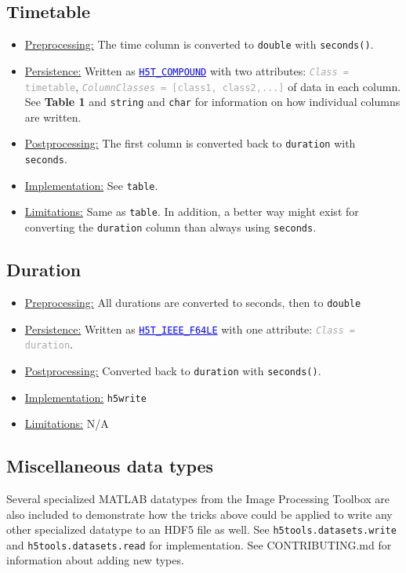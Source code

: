 \documentclass[11pt]{exam}
\newcommand\myurl[1]{\textcolor{blue}{\underline{#1}}}
\newcommand\myfcn[1]{\colorbox{codegray}{\textcolor{codeblue}{\texttt{#1}}}}
\newcommand\matfcn[1]{\textcolor{darkteal}{\texttt{#1}}}
\newcommand\hdftype[1]{\texttt{\myurl{#1}}}
\newcommand\myatt[2]{\textcolor{darkgray}{\texttt{\textit{#1} = #2}}}
\begin{document}
		\subsection{Timetable}
		\noindent
		\begin{itemize}
			\item \underline{Preprocessing:} The time column is converted to \texttt{double} with \matfcn{seconds()}. 
			\item \underline{Persistence:} Written as \hdftype{H5T\_COMPOUND} with two attributes: \myatt{Class}{timetable}, \myatt{ColumnClasses}{[class1, class2,...]} of data in each column. See \textbf{Table 1} and \texttt{string} and \texttt{char} for information on how individual columns are written.
			\item \underline{Postprocessing:} The first column is converted back to \texttt{duration} with \matfcn{seconds}.
			\item \underline{Implementation:} See \texttt{table}.%
			\item \underline{Limitations:} Same as \texttt{table}. In addition, a better way might exist for converting the \texttt{duration} column than always using \matfcn{seconds}.
		\end{itemize}

		\subsection{Duration}
		\noindent
		\begin{itemize}
			\item \underline{Preprocessing:} All durations are converted to seconds, then to \texttt{double}
			\item \underline{Persistence:} Written as \hdftype{H5T\_IEEE\_F64LE} with one attribute: \myatt{Class}{duration}.
			\item \underline{Postprocessing:} Converted back to \texttt{duration} with \matfcn{seconds()}.
			\item \underline{Implementation:} \matfcn{h5write}%
			\item \underline{Limitations:} N/A
		\end{itemize}

        \subsection{Miscellaneous data types}
        \noindent Several specialized MATLAB datatypes from the Image Processing Toolbox are also included to demonstrate how the tricks above could be applied to write any other specialized datatype to an HDF5 file as well. See \myfcn{h5tools.datasets.write} and \myfcn{h5tools.datasets.read} for implementation. See CONTRIBUTING.md for information about adding new types.
\end{document}
